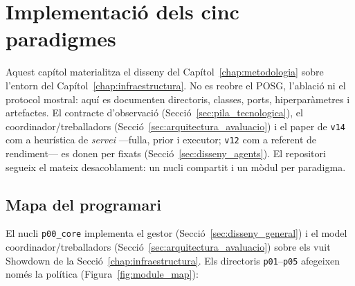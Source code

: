 \chapter{Implementació dels cinc paradigmes}
\label{chap:implementacio}

Aquest capítol materialitza el disseny del Capítol~\ref{chap:metodologia} sobre l'entorn del Capítol~\ref{chap:infraestructura}. No es reobre el POSG, l'ablació ni el protocol mostral: aquí es documenten directoris, classes, ports, hiperparàmetres i artefactes. El contracte d'observació (Secció~\ref{sec:pila_tecnologica}), el coordinador/treballadors (Secció~\ref{sec:arquitectura_avaluacio}) i el paper de \texttt{v14} com a heurística de \emph{servei} ---fulla, prior i executor; \texttt{v12} com a referent de rendiment--- es donen per fixats (Secció~\ref{sec:disseny_agents}). El repositori segueix el mateix desacoblament: un nucli compartit i un mòdul per paradigma.

\section{Mapa del programari}

El nucli \texttt{p00\_core} implementa el gestor (Secció~\ref{sec:disseny_general}) i el model coordinador/treballadors (Secció~\ref{sec:arquitectura_avaluacio}) sobre els vuit Showdown de la Secció~\ref{chap:infraestructura}. Els directoris \texttt{p01}--\texttt{p05} afegeixen només la política (Figura~\ref{fig:module_map}):

